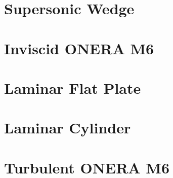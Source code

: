 \chapter{Supersonic Wedge}

\chapter{Inviscid ONERA M6}

\chapter{Laminar Flat Plate}

\chapter{Laminar Cylinder}

\chapter{Turbulent ONERA M6}